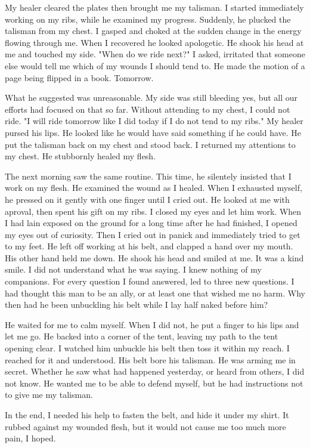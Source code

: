 \documentclass{article}
\begin{document}
My healer cleared the plates then brought me my talisman. I started immediately working on my ribs, while he examined my progress. Suddenly, he plucked the talisman from my chest. I gasped and choked at the sudden change in the energy flowing through me. When I recovered he looked apologetic. He shook his head at me and touched my side. "When do we ride next?" I asked, irritated that someone else would tell me which of my wounds I should tend to. He made the motion of a page being flipped in a book. Tomorrow.

What he suggested was unreasonable. My side was still bleeding yes, but all our efforts had focused on that so far. Without attending to my chest, I could not ride. "I will ride tomorrow like I did today if I do not tend to my ribs." My healer pursed his lips. He looked like he would have said something if he could have. He put the talisman back on my chest and stood back. I returned my attentions to my chest. He stubbornly healed my flesh.

The next morning saw the same routine. This time, he silentely insisted that I work on my flesh. He examined the wound as I healed. When I exhausted myself, he pressed on it gently with one finger until I cried out. He looked at me with aproval, then spent his gift on my ribs. I closed my eyes and let him work. When I had lain exposed on the ground for a long time after he had finished, I opened my eyes out of curiosity. Then I cried out in panick and immediately tried to get to my feet. He left off working at his belt, and clapped a hand over my mouth. His other hand held me down. He shook his head and smiled at me. It was a kind smile. I did not understand what he was saying. I knew nothing of my companions. For every question I found answered, led to three new questions. I had thought this man to be an ally, or at least one that wished me no harm. Why then had he been unbuckling his belt while I lay half naked before him? 

He waited for me to calm myself. When I did not, he put a finger to his lips and let me go. He backed into a corner of the tent, leaving my path to the tent opening clear. I watched him unbuckle his belt then toss it within my reach. I reached for it and understood. His belt bore his talisman. He was arming me in secret. Whether he saw what had happened yesterday, or heard from others, I did not know. He wanted me to be able to defend myself, but he had instructions not to give me my talisman. 

In the end, I needed his help to fasten the belt, and hide it under my shirt. It rubbed against my wounded flesh, but it would not cause me too much more pain, I hoped.
\end{document}
